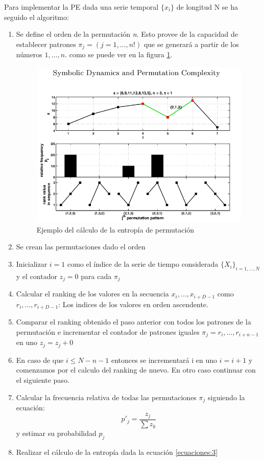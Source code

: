 Para implementar la PE dada una serie temporal $\{x_{i}\}$ de longitud N se ha seguido el algoritmo:
\begin{enumerate}
	\item Se define el orden de la permutación \textit{n}. Esto provee de la capacidad de establecer patrones $\pi_{j}=(j=1,\dots,n!)$ que se generará a partir de los números $1,\dots, n.$ como se puede ver en la figura \ref{desa:pe1}.
	
	\begin{figure}[H]
  		\centering
    	\includegraphics[scale=0.5]{img/pe_graph.png}
  		\caption{Ejemplo del cálculo de la entropía de permutación}\label{desa:pe1}
	\end{figure}
	\item Se crean las permutaciones dado el orden
	\item Inicializar $i=1$ como el índice de la serie de tiempo considerada $\{X_{i}\}_{i=1,\dots,N}$ y el contador $z_{j}=0$ para cada $\pi_{j}$
	\item Calcular el ranking de los valores en la secuencia $x_{i},\dots,x_{i+D-1}$ como $r_{i},\dots,r_{i+D-1}$: Los indices de los valores en orden ascendente.
	\item Comparar el ranking obtenido el paso anterior con todos los patrones de la permutación e incrementar el contador de patrones iguales $\pi_{j}=r_{i},\dots,r_{i+n-1}$ en uno $z_{j}=z_{j}+0$
	\item En caso de que $i \leq N-n-1$ entonces se incrementará i en uno $i=i+1$ y comenzamos por el calculo del ranking de nuevo. En otro caso continuar con el siguiente paso.
	\item Calcular la frecuencia relativa de todas las permutaciones $\pi_{j}$ siguiendo la ecuación:
		$$p'_{j}=\frac{z_{j}}{\sum{z_{k}}}$$ y estimar su probabilidad $p_j$
	\item Realizar el cálculo de la entropía dada la ecuación \ref{ecuaciones:3}
\end{enumerate}

